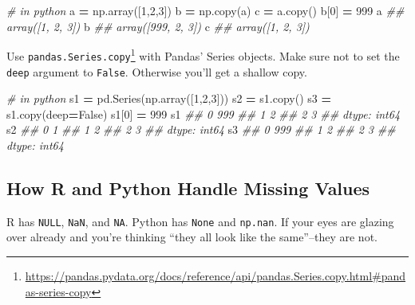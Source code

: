 \documentclass[
  12pt,
  krantz2]{krantz}
\makeatletter
\newenvironment{Shaded}{\begin{snugshade}}{\end{snugshade}}
\newcommand{\CommentTok}[1]{\textcolor[rgb]{0.37,0.37,0.37}{\textit{#1}}}
\newcommand{\DecValTok}[1]{\textcolor[rgb]{0.06,0.06,0.06}{#1}}
\newcommand{\NormalTok}[1]{#1}
\newcommand{\OperatorTok}[1]{\textcolor[rgb]{0.43,0.43,0.43}{\textbf{#1}}}
\newcommand{\VariableTok}[1]{\textcolor[rgb]{0,0,0}{#1}}
\renewcommand{\href}[2]{#2\footnote{\url{#1}}}
\newenvironment{kframe}{%
\medskip{}
\setlength{\fboxsep}{.8em}
 \def\at@end@of@kframe{}%
 \ifinner\ifhmode%
  \def\at@end@of@kframe{\end{minipage}}%
  \begin{minipage}{\columnwidth}%
 \fi\fi%
 \def\FrameCommand##1{\hskip\@totalleftmargin \hskip-\fboxsep
 \colorbox{shadecolor}{##1}\hskip-\fboxsep
     \hskip-\linewidth \hskip-\@totalleftmargin \hskip\columnwidth}%
 \MakeFramed {\advance\hsize-\width
   \@totalleftmargin\z@ \linewidth\hsize
   \@setminipage}}%
 {\par\unskip\endMakeFramed%
 \at@end@of@kframe}
\renewenvironment{Shaded}{\begin{kframe}}{\end{kframe}}
\makeatother
\begin{document}
\begin{Shaded}
\begin{Highlighting}[]
\CommentTok{\# in python}
\NormalTok{a }\OperatorTok{=}\NormalTok{ np.array([}\DecValTok{1}\NormalTok{,}\DecValTok{2}\NormalTok{,}\DecValTok{3}\NormalTok{])}
\NormalTok{b }\OperatorTok{=}\NormalTok{ np.copy(a)}
\NormalTok{c }\OperatorTok{=}\NormalTok{ a.copy()}
\NormalTok{b[}\DecValTok{0}\NormalTok{] }\OperatorTok{=} \DecValTok{999}
\NormalTok{a }
\CommentTok{\#\# array([1, 2, 3])}
\NormalTok{b}
\CommentTok{\#\# array([999,   2,   3])}
\NormalTok{c}
\CommentTok{\#\# array([1, 2, 3])}
\end{Highlighting}
\end{Shaded}

Use \href{https://pandas.pydata.org/docs/reference/api/pandas.Series.copy.html\#pandas-series-copy}{\texttt{pandas.Series.copy}} with Pandas' Series objects. Make sure not to set the \texttt{deep} argument to \texttt{False}. Otherwise you'll get a shallow copy.

\begin{Shaded}
\begin{Highlighting}[]
\CommentTok{\# in python}
\NormalTok{s1 }\OperatorTok{=}\NormalTok{ pd.Series(np.array([}\DecValTok{1}\NormalTok{,}\DecValTok{2}\NormalTok{,}\DecValTok{3}\NormalTok{]))}
\NormalTok{s2 }\OperatorTok{=}\NormalTok{ s1.copy()}
\NormalTok{s3 }\OperatorTok{=}\NormalTok{ s1.copy(deep}\OperatorTok{=}\VariableTok{False}\NormalTok{)}
\NormalTok{s1[}\DecValTok{0}\NormalTok{] }\OperatorTok{=} \DecValTok{999}
\NormalTok{s1}
\CommentTok{\#\# 0    999}
\CommentTok{\#\# 1      2}
\CommentTok{\#\# 2      3}
\CommentTok{\#\# dtype: int64}
\NormalTok{s2}
\CommentTok{\#\# 0    1}
\CommentTok{\#\# 1    2}
\CommentTok{\#\# 2    3}
\CommentTok{\#\# dtype: int64}
\NormalTok{s3}
\CommentTok{\#\# 0    999}
\CommentTok{\#\# 1      2}
\CommentTok{\#\# 2      3}
\CommentTok{\#\# dtype: int64}
\end{Highlighting}
\end{Shaded}

\hypertarget{how-r-and-python-handle-missing-values}{%
\subsection{How R and Python Handle Missing Values}\label{how-r-and-python-handle-missing-values}}

R has \texttt{NULL}, \texttt{NaN}, and \texttt{NA}. Python has \texttt{None} and \texttt{np.nan}. If your eyes are glazing over already and you're thinking ``they all look like the same''--they are not.
\end{document}
